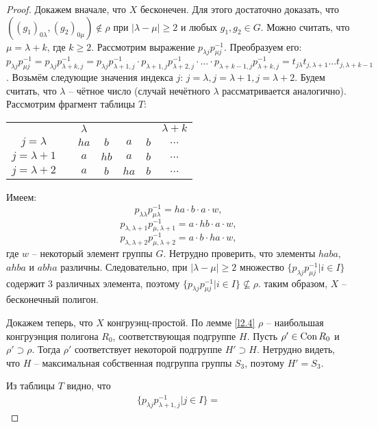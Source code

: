 \documentclass[a4paper]{article}
\newcommand{\Con}{\textnormal{Con}\, }
\begin{document}
	\begin{proof}
		Докажем вначале, что $X$ бесконечен. Для этого достаточно доказать, что $((g_1)_{0 \lambda},(g_2)_{0 \mu}) \notin \rho$ при $|\lambda - \mu| \geqslant 2$ и любых $g_1,g_2 \in G$. Можно считать, что $\mu = \lambda + k$, где $k \geqslant 2$. Рассмотрим выражение $p_{\lambda j} p_{\mu j}^{-1}$. Преобразуем его: $p_{\lambda j} p_{\mu j}^{-1} = p_{\lambda j} p_{\lambda + k, j}^{-1} = p_{\lambda j} p_{\lambda + 1, j}^{-1} \cdot p_{\lambda + 1,j} p_{\lambda + 2,j}^{-1} \cdot \ldots \cdot p_{\lambda + k - 1,j} p_{\lambda + k,j}^{-1} = t_{j \lambda}t_{j,\lambda+1} \ldots t_{j, \lambda + k - 1}$. Возьмём следующие значения индекса $j$: $j = \lambda, j = \lambda + 1, j = \lambda + 2$. Будем считать, что $\lambda$ -- чётное число (случай нечётного $\lambda$ рассматривается аналогично). Рассмотрим фрагмент таблицы $T$:
		\begin{center}
			\begin{tabular}{ccccccc}
					& & $\lambda$ & & & & $\lambda + k $ \\
				$j = \lambda$ & & $ha$ & $b$ & $a$ & $b$ & $\dots$ \\
				$j = \lambda+1$ & & $a$ & $hb$ & $a$ & $b$ & $\dots$ \\
				$j = \lambda+2$ & & $a$ & $b$ & $ha$ & $b$ & $\dots$
			\end{tabular}
		\end{center}
		Имеем: $$p_{\lambda \lambda} p_{\mu \lambda}^{-1} = ha \cdot b \cdot a \cdot w,$$ $$p_{\lambda, \lambda+1} p_{\mu, \lambda+1}^{-1} =a \cdot hb \cdot a \cdot w,$$ $$p_{\lambda, \lambda+2} p_{\mu, \lambda+2}^{-1} =a \cdot b \cdot ha \cdot w,$$ где $w$ -- некоторый элемент группы $G$. Нетрудно проверить, что элементы $haba$, $ahba$ и $abha$ различны. Следовательно, при $|\lambda - \mu| \geqslant 2$ множество $\{ p_{\lambda j} p_{\mu j}^{-1} | i \in I \}$ содержит 3 различных элемента, поэтому $\{ p_{\lambda j} p_{\mu j}^{-1} | i \in I \} \not \subseteq \rho$. таким образом, $X$ -- бесконечный полигон.
		\par Докажем теперь, что $X$ конгруэнц-простой. По лемме \ref{l2.4} $\rho$ -- наибольшая конгруэнция полигона $R_0$, соответствующая подгруппе $H$. Пусть $\rho' \in \Con R_0$ и $\rho' \supset \rho$. Тогда $\rho'$ соответствует некоторой подгруппе $H' \supset H$. Нетрудно видеть, что $H$ -- максимальная собственная  подгруппа группы $S_3$, поэтому $H' = S_3$.
		\par Из таблицы $T$ видно, что
		\begin{gather*}
		\{ p_{\lambda j} p_{\lambda+1,j}^{-1} | j \in I \} = 

\end{gather*}
\end{proof}
\end{document}
